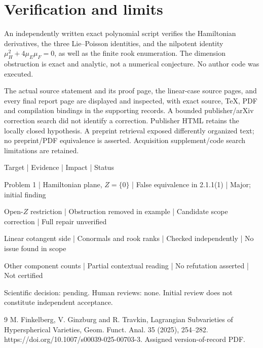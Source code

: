 \documentclass[10pt]{article}
\begin{document}
\section*{Verification and limits}
An independently written exact polynomial script verifies the Hamiltonian derivatives, the three Lie–Poisson identities, and the nilpotent identity \(\mu_H^2+4\mu_E\mu_F=0\), as well as the finite rook enumeration. The dimension obstruction is exact and analytic, not a numerical conjecture. No author code was executed.\par
The actual source statement and its proof page, the linear-case source pages, and every final report page are displayed and inspected, with exact source, TeX, PDF and compilation bindings in the supporting records. A bounded publisher/arXiv correction search did not identify a correction. Publisher HTML retains the locally closed hypothesis. A preprint retrieval exposed differently organized text; no preprint/PDF equivalence is asserted. Acquisition supplement/code search limitations are retained.\par
Target | Evidence | Impact | Status\par
Problem 1 | Hamiltonian plane, \(Z=\{0\}\) | False equivalence in 2.1.1(1) | Major; initial finding\par
Open-\(Z\) restriction | Obstruction removed in example | Candidate scope correction | Full repair unverified\par
Linear cotangent side | Conormals and rook ranks | Checked independently | No issue found in scope\par
Other component counts | Partial contextual reading | No refutation asserted | Not certified\par
Scientific decision: pending. Human reviews: none. Initial review does not constitute independent acceptance.\par
9 M. Finkelberg, V. Ginzburg and R. Travkin, Lagrangian Subvarieties of Hyperspherical Varieties, Geom. Funct. Anal. 35 (2025), 254–282. https://doi.org/10.1007/s00039-025-00703-3. Assigned version-of-record PDF.\par
\end{document}
